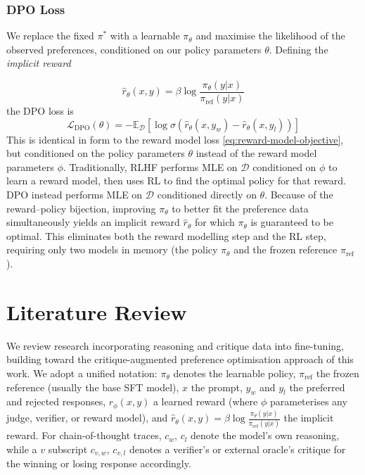 \documentclass[11pt]{article}
\begin{document}
\subsubsection{DPO Loss}
We replace the fixed $\pi^*$ with a learnable $\pi_\theta$ and maximise the likelihood of the observed preferences, conditioned on our policy parameters $\theta$. Defining the \textit{implicit reward}

\begin{equation}
    \hat{r}_\theta(x, y) = \beta \log\frac{\pi_\theta(y|x)}{\pi_{\text{ref}}(y|x)}
    \label{eq:implicit_reward}
\end{equation}
the DPO loss is
\begin{equation}
    \mathcal{L}_{\text{DPO}}(\theta) = - \mathbb{E}_{\mathcal{D}}
    \left[ \log \sigma
        \left(
        \hat{r}_\theta(x, y_{w})
        - \hat{r}_\theta(x, y_{l})
        \right)
        \right]
    \label{eq:dpo_loss}
\end{equation}
This is identical in form to the reward model loss \eqref{eq:reward-model-objective}, but conditioned on the policy parameters $\theta$ instead of the reward model parameters $\phi$. Traditionally, RLHF performs MLE on $\mathcal{D}$ conditioned on $\phi$ to learn a reward model, then uses RL to find the optimal policy for that reward. DPO instead performs MLE on $\mathcal{D}$ conditioned directly on $\theta$. Because of the reward--policy bijection, improving $\pi_\theta$ to better fit the preference data simultaneously yields an implicit reward $\hat{r}_\theta$ for which $\pi_\theta$ is guaranteed to be optimal. This eliminates both the reward modelling step and the RL step, requiring only two models in memory (the policy $\pi_\theta$ and the frozen reference $\pi_{\text{ref}}$).

\section{Literature Review}
\label{sec:lit}

We review research incorporating reasoning and critique data into fine-tuning, building toward the critique-augmented preference optimisation approach of this work. We adopt a unified notation: $\pi_\theta$ denotes the learnable policy, $\pi_{\text{ref}}$ the frozen reference (usually the base SFT model), $x$ the prompt, $y_w$ and $y_l$ the preferred and rejected responses, $r_\phi(x,y)$ a learned reward (where $\phi$ parameterises any judge, verifier, or reward model), and $\hat{r}_\theta(x,y) = \beta \log \frac{\pi_\theta(y|x)}{\pi_{\text{ref}}(y|x)}$ the implicit reward. For chain-of-thought traces, $c_w$, $c_l$ denote the model's own reasoning, while a $v$ subscript $c_{v,w}$, $c_{v,l}$ denotes a verifier's or external oracle's critique for the winning or losing response accordingly.
\end{document}
